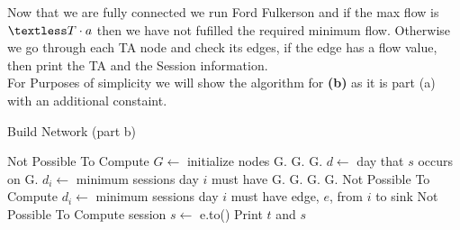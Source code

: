 \documentclass[12pt]{article}
\begin{document}
\indent Now that we are fully connected we run Ford Fulkerson and if the max flow is $\textless T\cdot a$ then we have
not fufilled the required minimum flow. Otherwise we go through each TA node and check its edges, if the
edge has a flow value, then print the TA and the Session information.  \\

\noindent For Purposes of simplicity we will show the algorithm for \textbf{(b)} as it is part (a) with an additional constaint.
\begin{algorithm}[H]
\caption{Build Network (part b)}
\begin{algorithmic}
    \EndProcedure
            Not Possible To Compute
        \EndIf
        \State $G \gets$ initialize nodes
            \State G.
            \State G.
                \State G.
            \EndFor
        \EndFor
        \State {}
            \State $d \gets$ day that $s$ occurs on
            \State G.
        \EndFor
            \State $d_i \gets$ minimum sessions day $i$ must have
            \State G.
            \State G.
        \EndFor
        \State G.
        \State G.
                Not Possible To Compute
            \EndIf
        \EndFor
            \State $d_i \gets$ minimum sessions day $i$ must have
            \State edge, $e$, from $i$ to sink
                Not Possible To Compute
            \EndIf
        \EndFor
                    \State session $s \gets$ e.to()
                    \State Print $t$ and $s$
                \EndIf
            \EndFor
        \EndFor
    \EndProcedure
\end{algorithmic}
\end{algorithm}


\newpage
\end{document}
